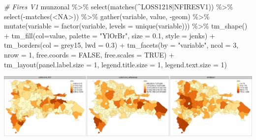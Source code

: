 \documentclass[10pt,landscape,a3paper]{article}
\newenvironment{Shaded}{\begin{snugshade}}{\end{snugshade}}
\newcommand{\AttributeTok}[1]{\textcolor[rgb]{0.77,0.63,0.00}{#1}}
\newcommand{\CommentTok}[1]{\textcolor[rgb]{0.56,0.35,0.01}{\textit{#1}}}
\newcommand{\ConstantTok}[1]{\textcolor[rgb]{0.00,0.00,0.00}{#1}}
\newcommand{\DecValTok}[1]{\textcolor[rgb]{0.00,0.00,0.81}{#1}}
\newcommand{\FloatTok}[1]{\textcolor[rgb]{0.00,0.00,0.81}{#1}}
\newcommand{\FunctionTok}[1]{\textcolor[rgb]{0.00,0.00,0.00}{#1}}
\newcommand{\NormalTok}[1]{#1}
\newcommand{\SpecialCharTok}[1]{\textcolor[rgb]{0.00,0.00,0.00}{#1}}
\newcommand{\StringTok}[1]{\textcolor[rgb]{0.31,0.60,0.02}{#1}}
\begin{document}
\begin{Shaded}
\begin{Highlighting}[]

\CommentTok{\# Fires V1}
\NormalTok{munzonal }\SpecialCharTok{\%\textgreater{}\%} \FunctionTok{select}\NormalTok{(}\FunctionTok{matches}\NormalTok{(}\StringTok{\textquotesingle{}\^{}LOSS1218|NFIRESV1\textquotesingle{}}\NormalTok{)) }\SpecialCharTok{\%\textgreater{}\%} \FunctionTok{select}\NormalTok{(}\SpecialCharTok{{-}}\FunctionTok{matches}\NormalTok{(}\StringTok{\textquotesingle{}\textless{}NA\textgreater{}\textquotesingle{}}\NormalTok{)) }\SpecialCharTok{\%\textgreater{}\%} 
  \FunctionTok{gather}\NormalTok{(variable, value, }\SpecialCharTok{{-}}\NormalTok{geom) }\SpecialCharTok{\%\textgreater{}\%}
  \FunctionTok{mutate}\NormalTok{(}\AttributeTok{variable =} \FunctionTok{factor}\NormalTok{(variable, }\AttributeTok{levels =} \FunctionTok{unique}\NormalTok{(variable))) }\SpecialCharTok{\%\textgreater{}\%} 
  \FunctionTok{tm\_shape}\NormalTok{() }\SpecialCharTok{+}
  \FunctionTok{tm\_fill}\NormalTok{(}\AttributeTok{col=}\StringTok{\textquotesingle{}value\textquotesingle{}}\NormalTok{, }\AttributeTok{palette =} \StringTok{"YlOrBr"}\NormalTok{, }\AttributeTok{size =} \FloatTok{0.1}\NormalTok{, }\AttributeTok{style =} \StringTok{\textquotesingle{}jenks\textquotesingle{}}\NormalTok{) }\SpecialCharTok{+}
  \FunctionTok{tm\_borders}\NormalTok{(}\AttributeTok{col =} \StringTok{\textquotesingle{}grey15\textquotesingle{}}\NormalTok{, }\AttributeTok{lwd =} \FloatTok{0.3}\NormalTok{) }\SpecialCharTok{+}
  \FunctionTok{tm\_facets}\NormalTok{(}\AttributeTok{by =} \StringTok{"variable"}\NormalTok{, }\AttributeTok{ncol =} \DecValTok{3}\NormalTok{, }\AttributeTok{nrow =} \DecValTok{1}\NormalTok{, }\AttributeTok{free.coords =} \ConstantTok{FALSE}\NormalTok{, }\AttributeTok{free.scales =} \ConstantTok{TRUE}\NormalTok{) }\SpecialCharTok{+}
  \FunctionTok{tm\_layout}\NormalTok{(}\AttributeTok{panel.label.size =} \DecValTok{1}\NormalTok{, }\AttributeTok{legend.title.size =} \DecValTok{1}\NormalTok{, }\AttributeTok{legend.text.size =} \DecValTok{1}\NormalTok{)}
\end{Highlighting}
\end{Shaded}

\begin{center}\includegraphics{img/zonal-mun-8} \end{center}
\end{document}

